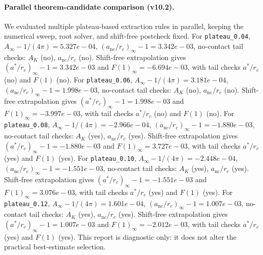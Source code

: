\paragraph{Parallel theorem-candidate comparison (v10.2).}
We evaluated multiple plateau-based extraction rules in parallel, keeping the numerical sweep, root solver, and shift-free postcheck fixed. For \texttt{plateau_0.04}, $A_\infty-1/(4\pi)=5.327e-04$, $(a_{\mathrm{nc}}/r_c)_\infty-1=3.342e-03$, no-contact tail checks: $A_K$ (no), $a_{\mathrm{nc}}/r_c$ (no). Shift-free extrapolation gives $(a^*/r_c)_\infty-1=3.342e-03$ and $F(1)_\infty=-6.694e-03$, with tail checks $a^*/r_c$ (no) and $F(1)$ (no). For \texttt{plateau_0.06}, $A_\infty-1/(4\pi)=3.181e-04$, $(a_{\mathrm{nc}}/r_c)_\infty-1=1.998e-03$, no-contact tail checks: $A_K$ (no), $a_{\mathrm{nc}}/r_c$ (no). Shift-free extrapolation gives $(a^*/r_c)_\infty-1=1.998e-03$ and $F(1)_\infty=-3.997e-03$, with tail checks $a^*/r_c$ (no) and $F(1)$ (no). For \texttt{plateau_0.08}, $A_\infty-1/(4\pi)=-2.966e-04$, $(a_{\mathrm{nc}}/r_c)_\infty-1=-1.880e-03$, no-contact tail checks: $A_K$ (yes), $a_{\mathrm{nc}}/r_c$ (yes). Shift-free extrapolation gives $(a^*/r_c)_\infty-1=-1.880e-03$ and $F(1)_\infty=3.727e-03$, with tail checks $a^*/r_c$ (yes) and $F(1)$ (yes). For \texttt{plateau_0.10}, $A_\infty-1/(4\pi)=-2.448e-04$, $(a_{\mathrm{nc}}/r_c)_\infty-1=-1.551e-03$, no-contact tail checks: $A_K$ (yes), $a_{\mathrm{nc}}/r_c$ (yes). Shift-free extrapolation gives $(a^*/r_c)_\infty-1=-1.551e-03$ and $F(1)_\infty=3.076e-03$, with tail checks $a^*/r_c$ (yes) and $F(1)$ (yes). For \texttt{plateau_0.12}, $A_\infty-1/(4\pi)=1.601e-04$, $(a_{\mathrm{nc}}/r_c)_\infty-1=1.007e-03$, no-contact tail checks: $A_K$ (yes), $a_{\mathrm{nc}}/r_c$ (yes). Shift-free extrapolation gives $(a^*/r_c)_\infty-1=1.007e-03$ and $F(1)_\infty=-2.012e-03$, with tail checks $a^*/r_c$ (yes) and $F(1)$ (yes). This report is diagnostic only: it does not alter the practical best-estimate selection.
